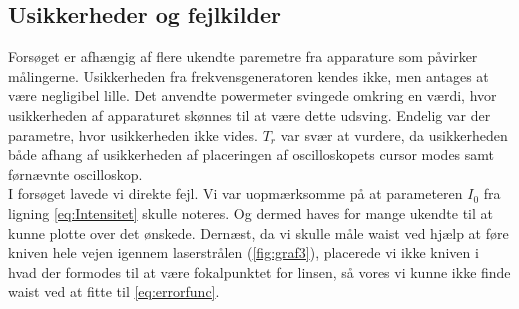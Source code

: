 \documentclass[main]{subfiles}
\begin{document}
\subsection{Usikkerheder og fejlkilder}
Forsøget er afhængig af flere ukendte paremetre fra apparature som påvirker målingerne. Usikkerheden fra frekvensgeneratoren kendes ikke, men antages at være negligibel lille. Det anvendte powermeter svingede omkring en værdi, hvor usikkerheden af apparaturet skønnes til at være dette udsving. Endelig var der parametre, hvor usikkerheden ikke vides. $T_r$ var svær at vurdere, da usikkerheden både afhang af usikkerheden af placeringen af oscilloskopets cursor modes samt førnævnte oscilloskop.
\\
I forsøget lavede vi direkte fejl. Vi var uopmærksomme på at parameteren $I_0$ fra ligning \cref{eq:Intensitet} skulle noteres. Og dermed haves for mange ukendte til at kunne plotte over det ønskede. Dernæst, da vi skulle måle waist ved hjælp at føre kniven hele vejen igennem laserstrålen (\cref{fig:graf3}), placerede vi ikke kniven i hvad der formodes til at være fokalpunktet for linsen, så vores vi kunne ikke finde waist ved at fitte til \cref{eq:errorfunc}.
\end{document}
